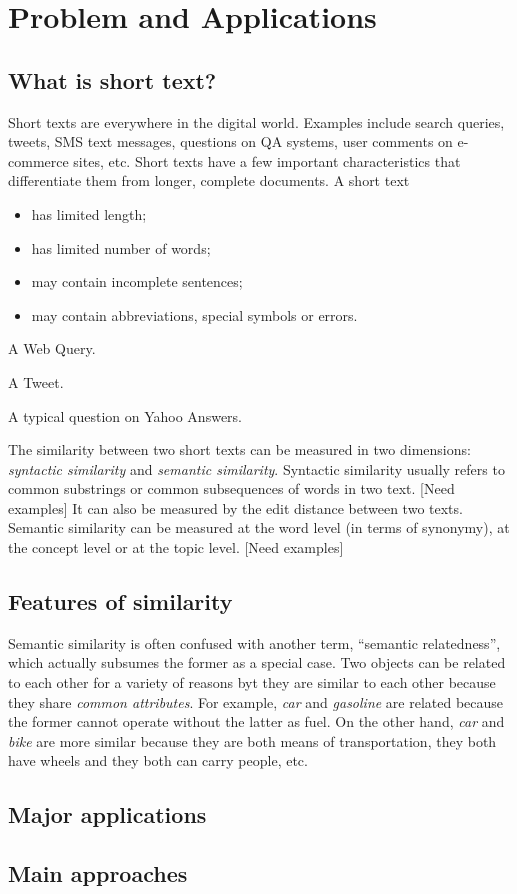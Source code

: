 \section{Problem and Applications}
\subsection{What is short text?}
Short texts are everywhere in the digital world. Examples include
search queries, tweets, SMS text messages, questions on QA systems,
user comments on e-commerce sites, etc. 
Short texts have a few important characteristics that differentiate
them from longer, complete documents. A short text
\begin{itemize}
\item has limited length;
\item has limited number of words;
\item may contain incomplete sentences;
\item may contain abbreviations, special symbols or errors.
\end{itemize}

\begin{example}
A Web Query.
\end{example}
\begin{example}
A Tweet.
\end{example}
\begin{example}
A typical question on Yahoo Answers.
\end{example}

The similarity between two short texts can be measured in two dimensions:
{\em syntactic similarity} and {\em semantic similarity}. 
Syntactic similarity usually refers to common substrings or common
subsequences \cite{} of words in two text. [Need examples] 
It can also be measured by the edit
distance \cite{} between two texts. Semantic similarity can be measured
at the word level (in terms of synonymy), at the concept level or at the 
topic level. [Need examples]

\subsection{Features of similarity}
Semantic similarity is often confused with another term, 
``semantic relatedness'', which actually subsumes the former as a special
case. Two objects can be related to each other for a variety of reasons byt
they are similar to each other because they share {\em common attributes}.
For example, {\em car} and {\em gasoline} are related because the former
cannot operate without the latter as fuel. On the other hand,
{\em car} and {\em bike} are more similar because they are both means of
transportation, they both have wheels and they both can carry people, etc.

\subsection{Major applications}

\subsection{Main approaches}
